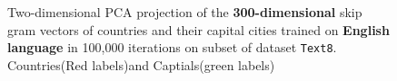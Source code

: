 \begin{figure}[htbp]
	\centering
	\caption{Two-dimensional PCA projection of the \textbf{300-dimensional} skip gram vectors of countries and their capital cities trained on \textbf{English language} in 100,000 iterations on subset of dataset \texttt{Text8}. Countries(Red labels)and Captials(green labels)}\label{fig:t}
\end{figure}
